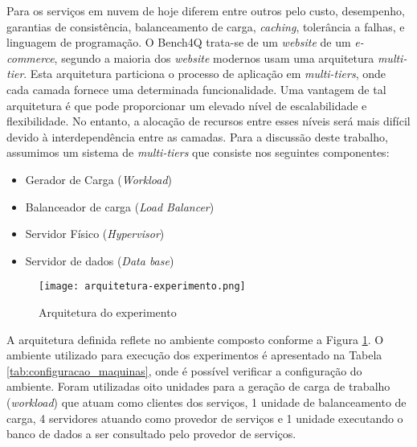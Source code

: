 Para  os serviços em nuvem de hoje diferem entre outros pelo custo, desempenho, garantias de consistência, balanceamento de carga, \textit{caching}, tolerância a falhas,  e linguagem de programação. O Bench4Q trata-se de um \textit{website} de um \textit{e-commerce}, segundo  a maioria dos \textit{website} modernos usam uma arquitetura \textit{multi-tier}. Esta arquitetura particiona o processo de aplicação em \textit{multi-tiers}, onde cada camada fornece uma determinada funcionalidade. Uma vantagem de tal arquitetura é que pode proporcionar um elevado nível de escalabilidade e flexibilidade. No entanto, a alocação de recursos entre esses níveis será mais difícil devido à interdependência entre as camadas. Para a discussão deste trabalho, assumimos um sistema de \textit{multi-tiers} que consiste nos seguintes componentes:

\begin{itemize}
	\item Gerador de Carga (\textit{Workload})
	\item Balanceador de carga (\textit{Load Balancer})
	\item Servidor Físico (\textit{Hypervisor})
	\item Servidor de dados (\textit{Data base})
\end{itemize}


\begin{figure}[!htb]
	\centering
	\texttt{[image: arquitetura-experimento.png]}
	\caption{Arquitetura do experimento}
	\label{fig:arquitetura-experimento}
	\fautor
\end{figure}

A arquitetura definida reflete no ambiente composto conforme a Figura \ref{fig:arquitetura-experimento}. O ambiente utilizado para execução dos experimentos é apresentado na Tabela \ref{tab:configuracao_maquinas}, onde é possível verificar a configuração do ambiente.
Foram utilizadas oito unidades para a geração de carga de trabalho (\textit{workload}) que atuam como clientes dos serviços, 1 unidade de balanceamento de carga, 4 servidores atuando como provedor de serviços e 1 unidade executando o banco de dados a ser consultado pelo provedor de serviços.

